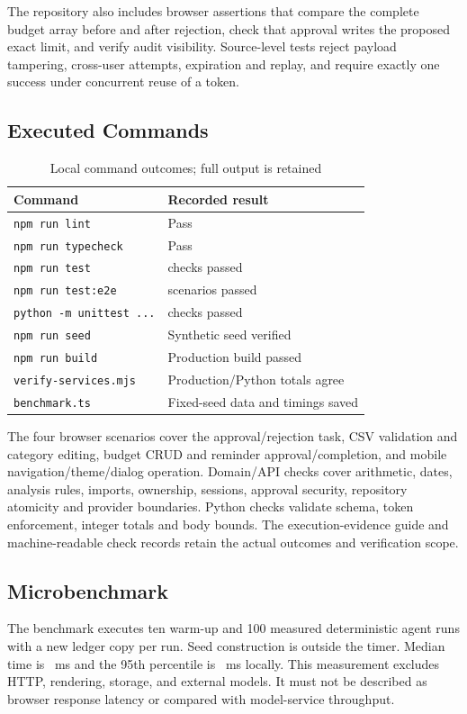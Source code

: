 \documentclass[conference,a4paper]{IEEEtran}
\begin{document}
The repository also includes browser assertions that compare the complete budget array before and after rejection, check that approval writes the proposed exact limit, and verify audit visibility. Source-level tests reject payload tampering, cross-user attempts, expiration and replay, and require exactly one success under concurrent reuse of a token.

\subsection{Executed Commands}
\begin{table}[t]
\caption{Local command outcomes; full output is retained}
\centering\small
\begin{tabular}{L{43mm}L{35mm}}
\toprule Command & Recorded result\\\midrule
\texttt{npm run lint} & Pass\\
\texttt{npm run typecheck} & Pass\\
\texttt{npm run test} & \UnitTests{} checks passed\\
\texttt{npm run test:e2e} & \BrowserTests{} scenarios passed\\
\texttt{python -m unittest ...} & \PythonTests{} checks passed\\
\texttt{npm run seed} & Synthetic seed verified\\
\texttt{npm run build} & Production build passed\\
\texttt{verify-services.mjs} & Production/Python totals agree\\
\texttt{benchmark.ts} & Fixed-seed data and timings saved\\
\bottomrule
\end{tabular}
\end{table}

The four browser scenarios cover the approval/rejection task, CSV validation and category editing, budget CRUD and reminder approval/completion, and mobile navigation/theme/dialog operation. Domain/API checks cover arithmetic, dates, analysis rules, imports, ownership, sessions, approval security, repository atomicity and provider boundaries. Python checks validate schema, token enforcement, integer totals and body bounds. The execution-evidence guide and machine-readable check records retain the actual outcomes and verification scope.

\subsection{Microbenchmark}
The benchmark executes ten warm-up and 100 measured deterministic agent runs with a new ledger copy per run. Seed construction is outside the timer. Median time is \AgentMedian{}~ms and the 95th percentile is \AgentPninetyfive{}~ms locally. This measurement excludes HTTP, rendering, storage, and external models. It must not be described as browser response latency or compared with model-service throughput.
\end{document}
